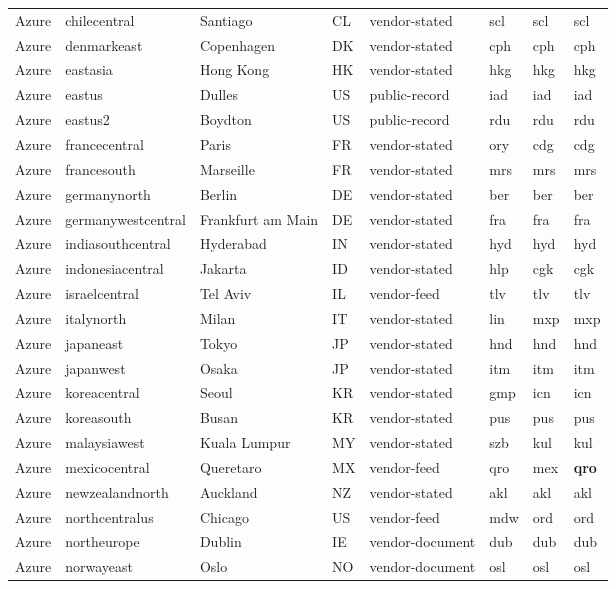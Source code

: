 \begin{longtable}{llllllll}
Azure & chilecentral & Santiago & CL & vendor-stated & scl & scl & scl \\
Azure & denmarkeast & Copenhagen & DK & vendor-stated & cph & cph & cph \\
Azure & eastasia & Hong Kong & HK & vendor-stated & hkg & hkg & hkg \\
Azure & eastus & Dulles & US & public-record & iad & iad & iad \\
Azure & eastus2 & Boydton & US & public-record & rdu & rdu & rdu \\
Azure & francecentral & Paris & FR & vendor-stated & ory & cdg & cdg \\
Azure & francesouth & Marseille & FR & vendor-stated & mrs & mrs & mrs \\
Azure & germanynorth & Berlin & DE & vendor-stated & ber & ber & ber \\
Azure & germanywestcentral & Frankfurt am Main & DE & vendor-stated & fra & fra & fra \\
Azure & indiasouthcentral & Hyderabad & IN & vendor-stated & hyd & hyd & hyd \\
Azure & indonesiacentral & Jakarta & ID & vendor-stated & hlp & cgk & cgk \\
Azure & israelcentral & Tel Aviv & IL & vendor-feed & tlv & tlv & tlv \\
Azure & italynorth & Milan & IT & vendor-stated & lin & mxp & mxp \\
Azure & japaneast & Tokyo & JP & vendor-stated & hnd & hnd & hnd \\
Azure & japanwest & Osaka & JP & vendor-stated & itm & itm & itm \\
Azure & koreacentral & Seoul & KR & vendor-stated & gmp & icn & icn \\
Azure & koreasouth & Busan & KR & vendor-stated & pus & pus & pus \\
Azure & malaysiawest & Kuala Lumpur & MY & vendor-stated & szb & kul & kul \\
Azure & mexicocentral & Queretaro & MX & vendor-feed & qro & mex & \textbf{qro} \\
Azure & newzealandnorth & Auckland & NZ & vendor-stated & akl & akl & akl \\
Azure & northcentralus & Chicago & US & vendor-feed & mdw & ord & ord \\
Azure & northeurope & Dublin & IE & vendor-document & dub & dub & dub \\
Azure & norwayeast & Oslo & NO & vendor-document & osl & osl & osl \\

\end{longtable}
